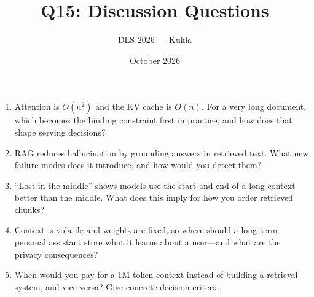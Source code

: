 \documentclass[11pt]{article}
\title{Q15: Discussion Questions}
\author{DLS 2026 --- Kukla}
\date{October 2026}
\begin{document}
\maketitle
\begin{enumerate}[leftmargin=1.5em]
\item Attention is $O(n^2)$ and the KV cache is $O(n)$. For a very long document, which becomes the binding constraint first in practice, and how does that shape serving decisions?
\item RAG reduces hallucination by grounding answers in retrieved text. What new failure modes does it introduce, and how would you detect them?
\item ``Lost in the middle'' shows models use the start and end of a long context better than the middle. What does this imply for how you order retrieved chunks?
\item Context is volatile and weights are fixed, so where should a long-term personal assistant store what it learns about a user---and what are the privacy consequences?
\item When would you pay for a 1M-token context instead of building a retrieval system, and vice versa? Give concrete decision criteria.
\end{enumerate}
\end{document}
